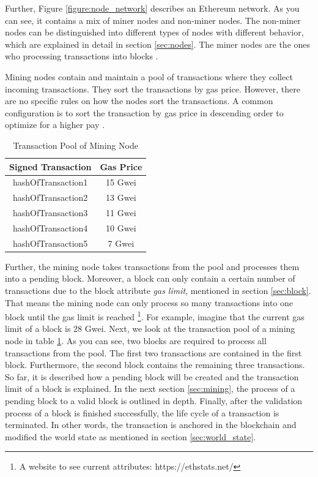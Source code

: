 \clearpage

Further, Figure \ref{figure:node_network} describes an Ethereum network. 
As you can see, it contains a mix of miner nodes and non-miner nodes. 
The non-miner nodes can be distinguished into different types of nodes with different 
behavior, which are explained in detail in section \ref{sec:nodes}. 
The miner nodes are the ones who processing transactions into blocks . 

Mining nodes contain and maintain a pool of transactions where they collect incoming transactions. 
They sort the transactions by gas price. 
However, there are no specific rules on how the nodes sort the transactions. 
A common configuration is to sort the transaction by gas price in descending order to 
optimize for a higher pay .

\begin{longtable}{c|c}
	\caption{Transaction Pool of Mining Node} 
	\label{table:sorted_gas_prices}
	\\
	\textbf{Signed Transaction} & \textbf{Gas Price} \\
	\hline
	hashOfTransaction1 & 15 Gwei \\
	hashOfTransaction2 & 13 Gwei \\
	hashOfTransaction3 & 11 Gwei \\
	hashOfTransaction4 & 10 Gwei \\
	hashOfTransaction5 & 7 Gwei \\
\end{longtable} 

Further, the mining node takes transactions from the pool and processes them into a pending block. 
Moreover, a block can only contain a certain number of transactions due to the block 
attribute \textit{gas limit}, mentioned in section \ref{sec:block}. 
That means the mining node can only process so many transactions into one 
block until the gas limit is reached \footnote{A website to see 
current attributes: https://ethstats.net/}. For example, 
imagine that the current gas limit of a block is 28 Gwei. 
Next, we look at the transaction pool of a mining node in 
table \ref{table:sorted_gas_prices}. As you can see, two blocks are 
required to process all transactions from the pool. The first two transactions 
are contained in the first block. Furthermore, the second block contains the remaining 
three transactions. 
So far, it is described how a pending block will be created and the transaction 
limit of a block is explained. In the next section \ref{sec:mining}, 
the process of a pending block to a valid block is outlined in depth. 
Finally, after the validation process of a block is finished successfully, 
the life cycle of a transaction is terminated. In other words, the transaction is anchored 
in the blockchain and modified the world state as mentioned in section \ref{sec:world_state}.


